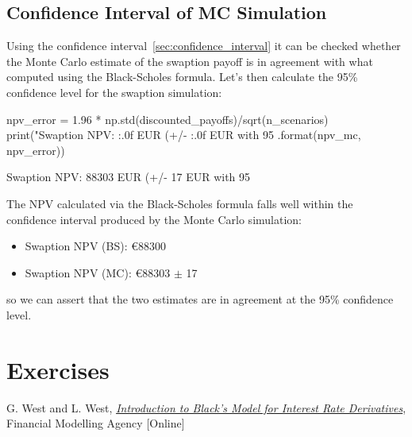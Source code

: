 \subsection{Confidence Interval of MC Simulation}

Using the confidence interval~\ref{sec:confidence_interval} it can be checked whether the Monte Carlo estimate of the swaption payoff is in agreement with what computed using the Black-Scholes formula.
Let's then calculate the 95\% confidence level for the swaption simulation:

\begin{ipython}
npv_error = 1.96 * np.std(discounted_payoffs)/sqrt(n_scenarios)
print("Swaption NPV: {:.0f} EUR (+/- {:.0f} EUR with 95%
    .format(npv_mc, npv_error))
\end{ipython}
\begin{ioutput}
Swaption NPV: 88303 EUR (+/- 17 EUR with 95%
\end{ioutput}

The NPV calculated via the Black-Scholes formula falls well within the confidence interval produced by the Monte Carlo simulation:

\begin{itemize}
\tightlist
\item
  Swaption NPV (BS): \euro{88300}
\item
  Swaption NPV (MC): \euro{88303} $\pm$ 17
\end{itemize}
so we can assert that the two estimates are in agreement at the 95\% confidence level.

\section*{Exercises}


\begin{thebibliography}{9}
 G. West and L. West, \href{http://janroman.dhis.org/finance/Black/IntroToBlack.pdf}{\emph{Introduction to Black's Model for Interest Rate Derivatives}}, Financial Modelling Agency [Online]
\end{thebibliography}